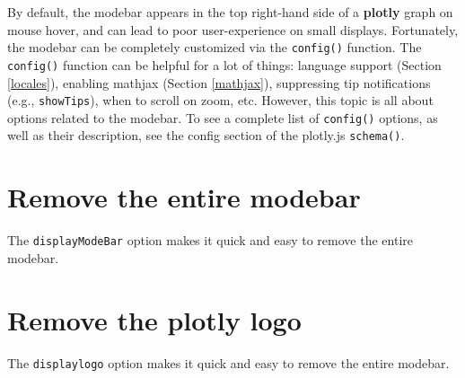 \documentclass[
  12pt,
]{krantz}
\newenvironment{Shaded}{\begin{snugshade}}{\end{snugshade}}
\newcommand{\DataTypeTok}[1]{\textcolor[rgb]{0.13,0.29,0.53}{#1}}
\newcommand{\KeywordTok}[1]{\textcolor[rgb]{0.13,0.29,0.53}{\textbf{#1}}}
\newcommand{\NormalTok}[1]{#1}
\newcommand{\OperatorTok}[1]{\textcolor[rgb]{0.81,0.36,0.00}{\textbf{#1}}}
\newcommand{\OtherTok}[1]{\textcolor[rgb]{0.56,0.35,0.01}{#1}}
\newcommand{\StringTok}[1]{\textcolor[rgb]{0.31,0.60,0.02}{#1}}
\begin{document}
By default, the modebar appears in the top right-hand side of a \textbf{plotly} graph on mouse hover, and can lead to poor user-experience on small displays. Fortunately, the modebar can be completely customized via the \texttt{config()} function. The \texttt{config()} function can be helpful for a lot of things: language support (Section \ref{locales}), enabling mathjax (Section \ref{mathjax}), suppressing tip notifications (e.g., \texttt{showTips}), when to scroll on zoom, etc. However, this topic is all about options related to the modebar. To see a complete list of \texttt{config()} options, as well as their description, see the config section of the plotly.js \texttt{schema()}.

\hypertarget{remove-the-entire-modebar}{%
\section{Remove the entire modebar}\label{remove-the-entire-modebar}}

The \texttt{displayModeBar} option makes it quick and easy to remove the entire modebar.


\begin{Shaded}
\end{Shaded}

\hypertarget{remove-the-plotly-logo}{%
\section{Remove the plotly logo}\label{remove-the-plotly-logo}}

The \texttt{displaylogo} option makes it quick and easy to remove the entire modebar.


\begin{Shaded}
\end{Shaded}
\end{document}
